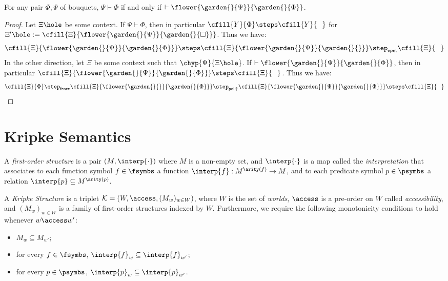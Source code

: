 \begin{theorem}[Deduction]\label{thm:deduction}
  For any pair $\Phi, \Psi$ of bouquets, $\Psi \vdash \Phi$ if and only if
  $\vdash \flower{\garden{{}}{\Psi}}{\garden{{}}{\Phi}}$.
\end{theorem}
\begin{proof}
  Let $\Xi\hole$ be some context. If $\Psi \vdash \Phi$, then in particular
  $\cfill{Y}{\Phi} \steps \cfill{Y}{\phantom{\Phi}}$ for $\Xi'\hole :=
  \cfill{\Xi}{\flower{\garden{{}}{\Psi}}{\garden{{}}{\square}}}$. Thus we have:
  $$
  \cfill{\Xi}{\flower{\garden{{}}{\Psi}}{\garden{{}}{\Phi}}} \steps
  \cfill{\Xi}{\flower{\garden{{}}{\Psi}}{\garden{{}}{}}} \step_{\mathsf{epet}}
  \cfill{\Xi}{\phantom{\Phi}}
  $$
  In the other direction, let $\Xi$ be some context such that
  $\chyp{\Psi}{\Xi\hole}$. If $\vdash
  \flower{\garden{{}}{\Psi}}{\garden{{}}{\Phi}}$, then in particular
  $\cfill{\Xi}{\flower{\garden{{}}{\Psi}}{\garden{{}}{\Phi}}} \steps
  \cfill{\Xi}{\phantom{\Phi}}$. Thus we have:
  $$
  \cfill{\Xi}{\Phi} \step_{\mathsf{fence}}
  \cfill{\Xi}{\flower{\garden{{}}{{}}}{\garden{{}}{\Phi}}} \step_{\mathsf{poll{\uparrow}}}
  \cfill{\Xi}{\flower{\garden{{}}{\Psi}}{\garden{{}}{\Phi}}} \steps
  \cfill{\Xi}{\phantom{\Phi}}
  $$
\end{proof}


\section{Kripke Semantics}


\begin{definition}
  A \emph{first-order structure} is a pair $( M, \interp{\cdot} )$
  where $M$ is a non-empty set, and $\interp{\cdot}$ is a map called the
  \emph{interpretation} that associates to each function symbol $f \in \fsymbs$
  a function $\interp{f} : M^{\arity(f)} \to M$, and to each predicate symbol $p
  \in \psymbs$ a relation $\interp{p} \subseteq M^{\arity(p)}$.
\end{definition}

\begin{definition}
  A \emph{Kripke Structure} is a triplet $\mathcal{K} = ( W, \access,
  (M_w)_{w \in W} )$, where $W$ is the set of \emph{worlds}, $\access$ is
  a pre-order on $W$ called \emph{accessibility}, and $(M_w)_{w \in W}$ is a
  family of first-order structures indexed by $W$. Furthermore, we require the
  following monotonicity conditions to hold whenever $w \access w'$:
  \begin{itemize}
    \item $M_w \subseteq M_{w'}$;
    \item for every $f \in \fsymbs$, $\interp{f}_w \subseteq
      \interp{f}_{w'}$;
    \item for every $p \in \psymbs$, $\interp{p}_w \subseteq
      \interp{p}_{w'}$.
  \end{itemize}
\end{definition}

